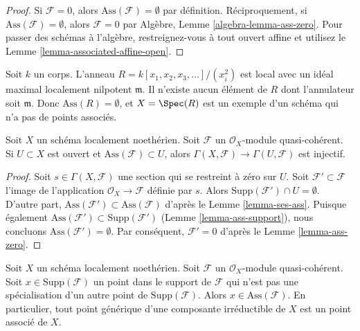 \begin{proof}
Si  $\mathcal{F} = 0$, alors  $\text{Ass}(\mathcal{F}) = \emptyset$  par définition. Réciproquement, si
 $\text{Ass}(\mathcal{F}) = \emptyset$, alors  $\mathcal{F} = 0$  par Algèbre, Lemme  \ref{algebra-lemma-ass-zero}. Pour passer des
schémas à l'algèbre, restreignez-vous à tout ouvert affine et utilisez le Lemme
 \ref{lemma-associated-affine-open}.
\end{proof}

\begin{example}
\label{example-no-associated-prime}
Soit  $k$  un corps. L'anneau  $R = k[x_1, x_2, x_3, \ldots]/(x_i^2)$  est local avec un idéal maximal
localement nilpotent  $\mathfrak m$. Il n'existe aucun élément de  $R$  dont
l'annulateur soit  $\mathfrak m$. Donc  $\text{Ass}(R) = \emptyset$, et  $X = \Spec(R)$  est un exemple
d'un schéma qui n'a pas de points associés.
\end{example}

\begin{lemma}
\label{lemma-restriction-injective-open-contains-ass}
Soit  $X$  un schéma localement noethérien. Soit  $\mathcal{F}$  un
 $\mathcal{O}_X$-module quasi-cohérent. Si  $U \subset X$  est ouvert et  $\text{Ass}(\mathcal{F}) \subset U$,
alors  $\Gamma(X, \mathcal{F}) \to \Gamma(U, \mathcal{F})$  est injectif.
\end{lemma}

\begin{proof}
Soit  $s \in \Gamma(X, \mathcal{F})$  une section qui se restreint à zéro sur  $U$. Soit
 $\mathcal{F}' \subset \mathcal{F}$  l'image de l'application  $\mathcal{O}_X \to \mathcal{F}$  définie par  $s$. Alors
 $\text{Supp}(\mathcal{F}') \cap U = \emptyset$. D'autre part,  $\text{Ass}(\mathcal{F}') \subset \text{Ass}(\mathcal{F})$  d'après le Lemme  \ref{lemma-ses-ass}. Puisque
également  $\text{Ass}(\mathcal{F}') \subset \text{Supp}(\mathcal{F}')$  (Lemme  \ref{lemma-ass-support}), nous concluons  $\text{Ass}(\mathcal{F}') = \emptyset$. Par
conséquent,  $\mathcal{F}' = 0$  d'après le Lemme  \ref{lemma-ass-zero}.
\end{proof}

\begin{lemma}
\label{lemma-minimal-support-in-ass}
Soit  $X$  un schéma localement noethérien. Soit  $\mathcal{F}$  un
 $\mathcal{O}_X$-module quasi-cohérent. Soit  $x \in \text{Supp}(\mathcal{F})$  un point dans le support de
 $\mathcal{F}$  qui n’est pas une spécialisation d’un autre point de  $\text{Supp}(\mathcal{F})$.
Alors  $x \in \text{Ass}(\mathcal{F})$. En particulier, tout point générique d’une composante
irréductible de  $X$  est un point associé de  $X$.
\end{lemma}

